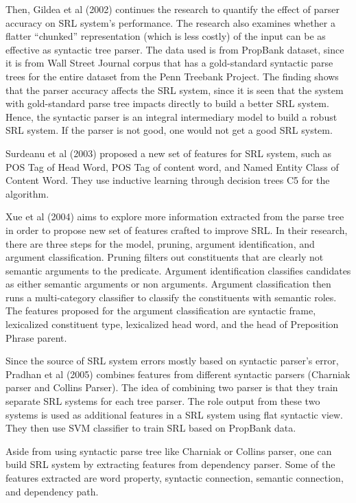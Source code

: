 Then, Gildea et al (2002) continues the research to quantify the effect of parser accuracy on SRL system’s performance. The research also examines whether a flatter “chunked” representation (which is less costly) of the input can be as effective as syntactic tree parser. The data used is from PropBank dataset, since it is from Wall Street Journal corpus that has a gold-standard syntactic parse trees for the entire dataset from the Penn Treebank Project. The finding shows that the parser accuracy affects the SRL system, since it is seen that the system with gold-standard parse tree impacts directly to build a better SRL system. Hence, the syntactic parser is an integral intermediary model to build a robust SRL system. If the parser is not good, one would not get a good SRL system.

Surdeanu et al (2003) proposed a new set of features for SRL system, such as POS Tag of Head Word, POS Tag of content word, and Named Entity Class of Content Word. They use inductive learning through decision trees C5 for the algorithm.

Xue et al (2004) aims to explore more information extracted from the parse tree in order to propose new set of features crafted to improve SRL. In their research, there are three steps for the model, pruning, argument identification, and argument classification. Pruning filters out constituents that are clearly not semantic arguments to the predicate. Argument identification classifies candidates as either semantic arguments or non arguments. Argument classification then runs a multi-category classifier to classify the constituents with semantic roles. The features proposed for the argument classification are syntactic frame, lexicalized constituent type, lexicalized head word, and the head of Preposition Phrase parent.

Since the source of SRL system errors mostly based on syntactic parser’s error, Pradhan et al (2005) combines features from different syntactic parsers (Charniak parser and Collins Parser). The idea of combining two parser is that they train separate SRL systems for each tree parser. The role output from these two systems is used as additional features in a SRL system using flat syntactic view. They then use SVM classifier to train SRL based on PropBank data.

Aside from using syntactic parse tree like Charniak or Collins parser, one can build SRL system by extracting features from dependency parser. Some of the features extracted are word property, syntactic connection, semantic connection, and dependency path.

